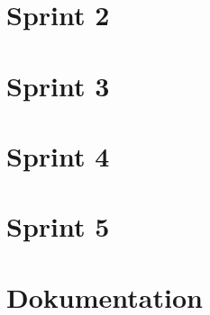 \documentclass[twoside]{report}
\begin{document}
\newpage

\section{Sprint 2}



\newpage

\section{Sprint 3}

%

\newpage

\section{Sprint 4}



\newpage
\section{Sprint 5}



\newpage




\section{Dokumentation}
\end{document}
